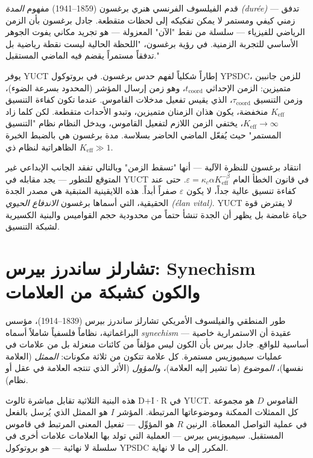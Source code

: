 \documentclass[12pt,a4paper]{article}
\begin{document}
	قدم الفيلسوف الفرنسي هنري برغسون (1859–1941) مفهوم \emph{المدة (durée)} — تدفق زمني كيفي ومستمر لا يمكن تفكيكه إلى لحظات متقطعة. جادل برغسون بأن الزمن الرياضي للفيزياء — سلسلة من نقط "الآن" المعزولة — هو تجريد مكاني يفوت الجوهر الأساسي للتجربة الزمنية. في رؤية برغسون، "اللحظة الحالية ليست نقطة رياضية بل تدفقاً مستمراً يقضم فيه الماضي المستقبل."
	
	يوفر YUCT إطاراً شكلياً لفهم حدس برغسون. في بروتوكول YPSDC، للزمن جانبين متميزين: الزمن الإحداثي \(t_{\text{coord}}\)، وهو زمن إرسال المؤشر (المحدود بسرعة الضوء)، وزمن التنسيق \(\tau_{\text{coord}}\)، الذي يقيس تفعيل مدخلات القاموس. عندما تكون كفاءة التنسيق \(K_{\mathrm{eff}}\) منخفضة، يكون هذان الزمنان متميزين، وتبدو الأحداث متقطعة. لكن كلما زاد \(K_{\mathrm{eff}} \to \infty\)، يختفي الزمن اللازم لتفعيل القاموس، ويدخل النظام نظام "التنسيق المستمر" حيث يُفعّل الماضي الحاضر بسلاسة. مدة برغسون هي بالضبط الخبرة الظاهراتية لنظام ذي \(K_{\mathrm{eff}} \gg 1\).
	
	انتقاد برغسون للنظرة الآلية — أنها "تسقط الزمن" وبالتالي تفقد الجانب الإبداعي غير المتوقع للتطور — يجد مقابله في YUCT في قانون الخطأ العام \(\varepsilon = \kappa_c \alpha K_{\mathrm{eff}}^{-\beta}\). حتى عند كفاءة تنسيق عالية جداً، لا يكون \(\varepsilon\) صفراً أبداً. هذه اللايقينية المتبقية هي مصدر الجدة الحقيقية، التي أسماها برغسون \emph{الاندفاع الحيوي (élan vital)}. YUCT لا يفترض قوة حياة غامضة بل يظهر أن الجدة تنشأ حتماً من محدودية حجم القواميس والبنية الكسيرية لشبكة التنسيق.
	
	\section{تشارلز ساندرز بيرس: Synechism والكون كشبكة من العلامات}
	
	طور المنطقي والفيلسوف الأمريكي تشارلز ساندرز بيرس (1839–1914)، مؤسس البراغماتية، نظاماً فلسفياً شاملاً أسماه \emph{synechism} — عقيدة أن الاستمرارية خاصية أساسية للواقع. جادل بيرس بأن الكون ليس مؤلفاً من كائنات منعزلة بل من علامات في عمليات سيميوزيس مستمرة. كل علامة تتكون من ثلاثة مكونات: \emph{الممثل} (العلامة نفسها)، \emph{الموضوع} (ما تشير إليه العلامة)، و\emph{المؤول} (الأثر الذي تنتجه العلامة في عقل أو نظام).
	
	هذه البنية الثلاثية تقابل مباشرة ثالوث D+I·R في YUCT. القاموس \(D\) هو مجموعة كل الممثلات الممكنة وموضوعاتها المرتبطة. المؤشر \(I\) هو الممثل الذي يُرسل بالفعل في عملية التواصل المعطاة. الرنين \(R\) هو المؤوِّل — تفعيل المعنى المرتبط في قاموس المستقبل. سيميوزيس بيرس — العملية التي تولد بها العلامات علامات أخرى في سلسلة لا نهائية — هو بروتوكول YPSDC المكرر إلى ما لا نهاية.
	
\end{document}
